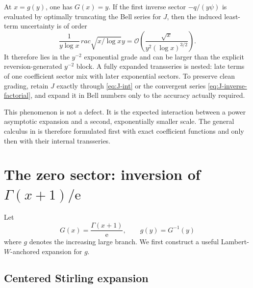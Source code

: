 \documentclass[11pt,oneside]{article}
\theoremstyle{plain}
\theoremstyle{definition}
\theoremstyle{remark}
\newcommand{\ee}{\mathrm{e}}
\newcommand{\bigO}{\mathcal{O}}
\begin{document}
\begin{warningbox}[title={The Bell coefficient expansion invades the next exponential sector}]
At \(x=g(y)\), one has \(G(x)=y\).  If the first inverse sector
\(-q/(y\psi)\) is evaluated by optimally truncating the Bell series for \(J\),
then the induced least-term uncertainty is of order
\begin{equation}
 \frac{1}{y\log x}\,
rac{\sqrt{x/\log x}}{y}
 =\bigO\!\left(\frac{\sqrt{x}}{y^2(\log x)^{3/2}}\right).
 \label{eq:Bell-sector-mixing}
\end{equation}
It therefore lies in the \(y^{-2}\) exponential grade and can be larger than
the explicit reversion-generated \(y^{-2}\) block.  A fully expanded
transseries is nested: late terms of one coefficient sector mix with later
exponential sectors.  To preserve clean grading, retain \(J\) exactly through
\eqref{eq:J-int} or the convergent series \eqref{eq:J-inverse-factorial}, and
expand it in Bell numbers only to the accuracy actually required.
\end{warningbox}

This phenomenon is not a defect.  It is the expected interaction between a
power asymptotic expansion and a second, exponentially smaller scale.  The
general calculus in  is therefore formulated first
with exact coefficient functions and only then with their internal
transseries.

\section{The zero sector: inversion of \texorpdfstring{\(\Gamma(x+1)/\ee\)}{Gamma(x+1)/e}}
\label{sec:inverse-gamma}

Let
\begin{equation}
 G(x)=\frac{\Gamma(x+1)}{\ee},
 \qquad g(y)=G^{-1}(y)
 \label{eq:G-g-def}
\end{equation}
where \(g\) denotes the increasing large branch.  We first construct a useful
Lambert-\(W\)-anchored expansion for \(g\).

\subsection{Centered Stirling expansion}
\end{document}
